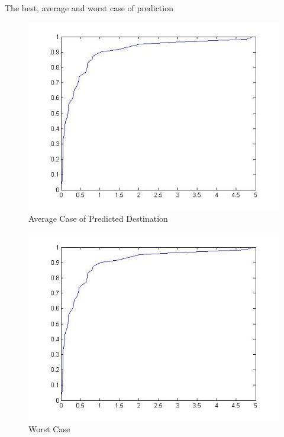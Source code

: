 The best, average and worst case of prediction 
\begin{figure}[H]
\centering   
\includegraphics[scale=0.4]{figs/average_nextLoc.jpg}
\caption{Average Case of Predicted Destination}
\label{fig:average_nextLoc}  
\end{figure} 
\begin{figure}
\centering     
\includegraphics[scale=0.4]{figs/worst_nextLoc.jpg}
\caption{Worst Case }
\label{fig:worst_nextLoc}  
\end{figure} 
